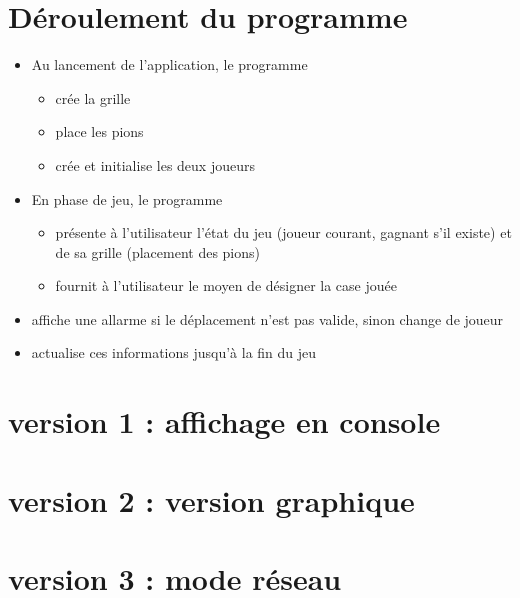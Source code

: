 \documentclass[12pt]{article}
\begin{document}
\section{Déroulement du programme}
 \begin{itemize}
 \item Au lancement de l'application, le programme
 \begin{itemize}
  \item[\textbullet] crée la grille
  \item[\textbullet] place les pions
  \item[\textbullet] crée et initialise les deux joueurs
 \end{itemize}
 \item En phase de jeu, le programme
 \begin{itemize}
  \item[\textbullet] présente à l'utilisateur l'état du jeu (joueur courant, gagnant s'il existe) et de sa grille (placement des pions)
  \item[\textbullet] fournit à l'utilisateur le moyen de désigner la case jouée
  \end{itemize}
 
  \item affiche une allarme si le déplacement n'est pas valide, sinon change de joueur
  \item actualise ces informations jusqu'à la fin du jeu
 \end{itemize}
\section{version 1 : affichage en console}

\section{version 2 : version graphique}

\section{version 3 : mode réseau}

 
\end{document}
